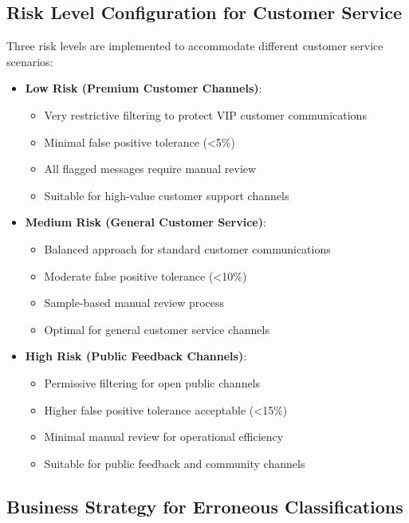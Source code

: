 \documentclass[12pt,a4paper]{article}
\begin{document}
\subsection{Risk Level Configuration for Customer Service}

Three risk levels are implemented to accommodate different customer service scenarios:

\begin{itemize}
    \item \textbf{Low Risk (Premium Customer Channels)}: 
    \begin{itemize}
        \item Very restrictive filtering to protect VIP customer communications
        \item Minimal false positive tolerance (<5\%)
        \item All flagged messages require manual review
        \item Suitable for high-value customer support channels
    \end{itemize}
    
    \item \textbf{Medium Risk (General Customer Service)}: 
    \begin{itemize}
        \item Balanced approach for standard customer communications
        \item Moderate false positive tolerance (<10\%)
        \item Sample-based manual review process
        \item Optimal for general customer service channels
    \end{itemize}
    
    \item \textbf{High Risk (Public Feedback Channels)}: 
    \begin{itemize}
        \item Permissive filtering for open public channels
        \item Higher false positive tolerance acceptable (<15\%)
        \item Minimal manual review for operational efficiency
        \item Suitable for public feedback and community channels
    \end{itemize}
\end{itemize}

\subsection{Business Strategy for Erroneous Classifications}
\end{document}

